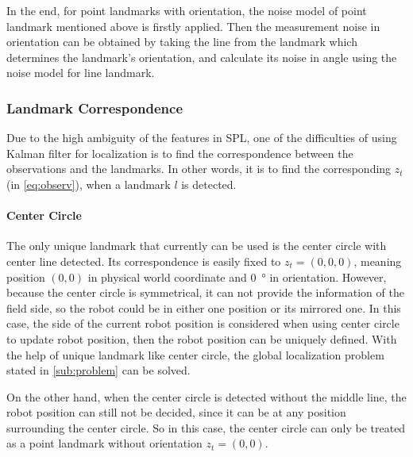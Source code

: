 In the end, for point landmarks with orientation, the noise model of point landmark mentioned above is firstly applied. Then the measurement noise in orientation can be obtained by taking the line from the landmark which determines the landmark's orientation, and calculate its noise in angle using the noise model for line landmark.


\subsubsection{Landmark Correspondence}\label{subsub:landmarkco}
Due to the high ambiguity of the features in \gls{SPL}, one of the difficulties of using Kalman filter for localization is to find the correspondence between the observations and the landmarks. In other words, it is to find the corresponding $z_t$ (in \autoref{eq:observ}), when a landmark $l$ is detected. 

\paragraph{Center Circle}
The only unique landmark that currently can be used is the center circle with center line detected. Its correspondence is easily fixed to $z_t = (0,0,0)$, meaning position $(0,0)$ in physical world coordinate and \SI{0}{\degree} in orientation. However, because the center circle is symmetrical, it can not provide the information of the field side, so the robot could be in either one position or its mirrored one. In this case, the side of the current robot position is considered when using center circle to update robot position, then the robot position can be uniquely defined. With the help of unique landmark like center circle, the global localization problem stated in \autoref{sub:problem} can be solved.

On the other hand, when the center circle is detected without the middle line, the robot position can still not be decided, since it can be at any position surrounding the center circle. So in this case, the center circle can only be treated as a point landmark without orientation $z_t = (0,0)$.


